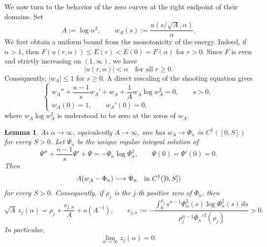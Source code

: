 \documentclass[11pt]{article}
\newtheorem{lemma}[theorem]{Lemma}
\begin{document}
We now turn to the behavior of the zero curves at the right endpoint of their domains.
Set
\[
 A:=\log\alpha^2,
 \qquad
 w_A(s):=\frac{u(s/\sqrt A,\alpha)}{\alpha}.
\]
We first obtain a uniform bound from the monotonicity of the energy. Indeed, if $\alpha>1$, then $F(u(r,\alpha))\leq E(r)<E(0)=F(\alpha)$ for $r>0$.
Since $F$ is even and strictly increasing on $(1,\infty)$, we have
\begin{equation*}
 |u(r,\alpha)|<\alpha
 \quad\text{for all }r\geq0.
\end{equation*}
Consequently, $|w_A|\leq1$ for $s\geq0$. A direct rescaling of the shooting equation gives
\begin{equation}
 \begin{cases}
 {w_A''+\dfrac{n-1}{s}w_A'+w_A+\dfrac{1}{A} w_A\log w_A^2=0,\qquad  s>0,}\\[4pt]
 w_A(0)=1,\qquad w_A'(0)=0,
 \end{cases}
 \label{eq:scaled}
\end{equation}
where $w_A\log w_A^2$ is understood to be zero at the zeros of $w_A$.

\begin{lemma}\label{lem:log-bessel}
As $\alpha\to\infty$, equivalently $A\to\infty$, one has
$w_A\to\Phi_n$ in $C^1([0,S])$ for every $S>0$. Let $\Psi_n$ be the
unique regular integral solution of
\begin{equation}\label{eq:log-second-profile}
 \Psi''+\frac{n-1}{s}\Psi'+\Psi
 =-\Phi_n\log\Phi_n^2,
 \qquad \Psi(0)=\Psi'(0)=0.
\end{equation}
Then
\begin{equation}\label{eq:log-second-profile-convergence}
 A(w_A-\Phi_n)\longrightarrow\Psi_n
 \quad\hbox{in }C^1([0,S])
\end{equation}
for every $S>0$. Consequently, if $\rho_j$ is the $j$-th positive zero
of $\Phi_n$, then
\begin{equation}\label{eq:zeroasymptotic}
 \sqrt A\,z_j(\alpha)
 =\rho_j+\frac{c_{j,n}}{A}+o(A^{-1}),
 \qquad
 c_{j,n}:=-\frac{\displaystyle\int_0^{\rho_j}
 s^{n-1}\Phi_n^2(s)\log\Phi_n^2(s)\,ds}
 {\rho_j^{n-1}\Phi_n'^2(\rho_j)}>0.
\end{equation}
In particular,
\begin{equation}\label{eq:z-zero}
 \lim_{\alpha\to\infty}z_j(\alpha)=0.
\end{equation}
\end{lemma}
\end{document}
